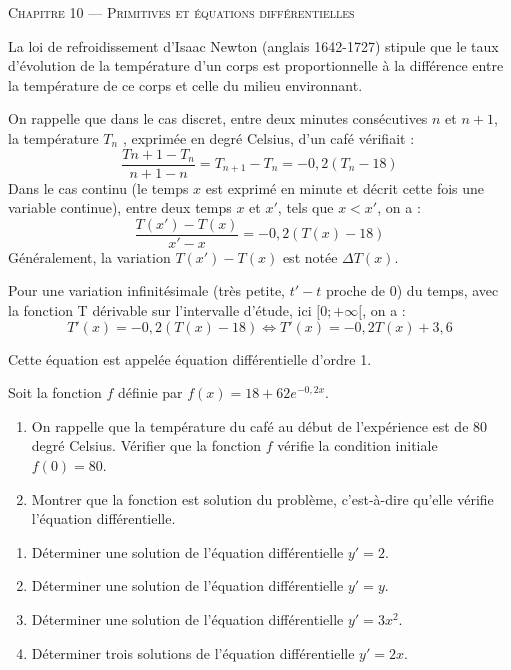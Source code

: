 \documentclass[a4paper]{article}
\begin{document}
\begin{center}
  {\scshape\LARGE Chapitre 10 --- Primitives et équations différentielles\par}
\end{center}

\begin{activite}{}{}
  La loi de refroidissement d'Isaac Newton (anglais 1642-1727) stipule que le taux d'évolution de la température d'un corps est proportionnelle
  à la différence entre la température de ce corps et celle du milieu environnant.

On rappelle que dans le cas discret, entre deux minutes consécutives $n$ et $n + 1$, la température $T_n$ , exprimée en degré Celsius, d'un café vérifiait :
$$\dfrac{T{n+1}-T_n}{n+1-n}=T_{n+1}-T_n=-0,2(T_n-18)$$
Dans le cas continu (le temps $x$ est exprimé en minute et décrit cette fois une variable continue), entre deux temps $x$ et $x'$, tels que $x<x'$, on a :
$$\dfrac{T(x')-T(x)}{x'-x}=-0,2(T(x)-18)$$
Généralement, la variation $T(x')-T(x)$ est notée $\Delta T(x)$.


Pour une variation infinitésimale (très petite, $t'-t$ proche de 0) du temps, avec la fonction T dérivable sur l'intervalle d'étude, ici $[0;+\infty[$, on a :
$$T'(x)=-0,2(T(x)-18) \iff T'(x)=-0,2T(x)+3,6$$

Cette équation est appelée équation différentielle d'ordre 1.

Soit la fonction $f$ définie par $f(x)=18+62e^{-0,2x}$.

\begin{enumerate}
  \item On rappelle que la température du café au début de l'expérience est de 80 degré Celsius. Vérifier que la fonction $f$ vérifie la condition initiale $f(0)=80$.
  \item Montrer que la fonction est solution du problème, c'est-à-dire qu'elle vérifie l'équation différentielle.
\end{enumerate}
\end{activite}

\begin{activite}{}{}
\begin{enumerate}
  \item Déterminer une solution de l'équation différentielle $y'=2$.
  \item Déterminer une solution de l'équation différentielle $y'=y$.
  \item Déterminer une solution de l'équation différentielle $y'=3x^2$.
  \item Déterminer trois solutions de l'équation différentielle $y'=2x$.
\end{enumerate}
\end{activite}
\end{document}
